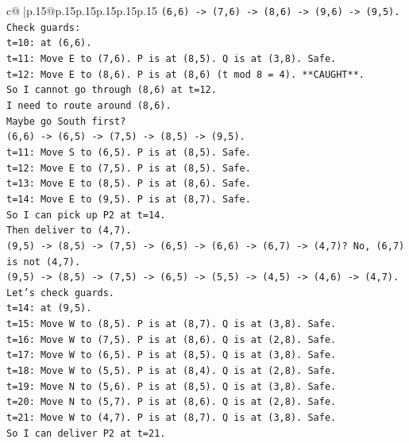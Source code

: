 \documentclass{article}
\begin{document}
{\begin{supertabular}{c@{$\;$}|p{.15\linewidth}@{}p{.15\linewidth}p{.15\linewidth}p{.15\linewidth}p{.15\linewidth}p{.15\linewidth}}
{{{\texttt{(6,6) {-}> (7,6) {-}> (8,6) {-}> (9,6) {-}> (9,5).} \\
\texttt{Check guards:} \\
\texttt{t=10: at (6,6).} \\
\texttt{t=11: Move E to (7,6). P is at (8,5). Q is at (3,8). Safe.} \\
\texttt{t=12: Move E to (8,6). P is at (8,6) (t mod 8 = 4). **CAUGHT**.} \\
\texttt{So I cannot go through (8,6) at t=12.} \\
\texttt{I need to route around (8,6).} \\
\texttt{Maybe go South first?} \\
\texttt{(6,6) {-}> (6,5) {-}> (7,5) {-}> (8,5) {-}> (9,5).} \\
\texttt{t=11: Move S to (6,5). P is at (8,5). Safe.} \\
\texttt{t=12: Move E to (7,5). P is at (8,5). Safe.} \\
\texttt{t=13: Move E to (8,5). P is at (8,6). Safe.} \\
\texttt{t=14: Move E to (9,5). P is at (8,7). Safe.} \\
\texttt{So I can pick up P2 at t=14.} \\
\texttt{Then deliver to (4,7).} \\
\texttt{(9,5) {-}> (8,5) {-}> (7,5) {-}> (6,5) {-}> (6,6) {-}> (6,7) {-}> (4,7)? No, (6,7) is not (4,7).} \\
\texttt{(9,5) {-}> (8,5) {-}> (7,5) {-}> (6,5) {-}> (5,5) {-}> (4,5) {-}> (4,6) {-}> (4,7).} \\
\texttt{Let's check guards.} \\
\texttt{t=14: at (9,5).} \\
\texttt{t=15: Move W to (8,5). P is at (8,7). Q is at (3,8). Safe.} \\
\texttt{t=16: Move W to (7,5). P is at (8,6). Q is at (2,8). Safe.} \\
\texttt{t=17: Move W to (6,5). P is at (8,5). Q is at (3,8). Safe.} \\
\texttt{t=18: Move W to (5,5). P is at (8,4). Q is at (2,8). Safe.} \\
\texttt{t=19: Move N to (5,6). P is at (8,5). Q is at (3,8). Safe.} \\
\texttt{t=20: Move N to (5,7). P is at (8,6). Q is at (2,8). Safe.} \\
\texttt{t=21: Move W to (4,7). P is at (8,7). Q is at (3,8). Safe.} \\
\texttt{So I can deliver P2 at t=21.} \\
}}}
\end{supertabular}}
\end{document}
